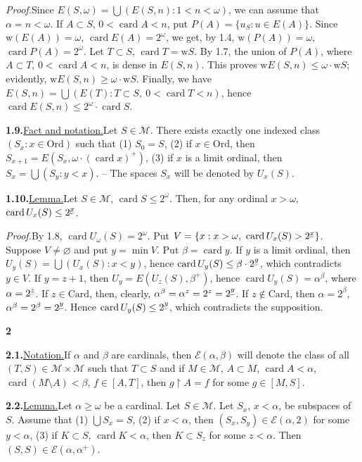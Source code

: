 \documentclass[12pt,a4paper]{article}
\newcommand{\M}{\mathcal{M}}
\newcommand{\E}{\mathcal{E}}
\newcommand{\card}{\operatorname{card}}
\newcommand{\Ord}{\mathrm{Ord}}
\newcommand{\Card}{\mathrm{Card}}
\newcommand{\wt}{\mathrm{w}}
\newcommand{\suprexp}[1]{\underaccent{\smile}{#1}}
\newcommand{\res}{\mathbin{\upharpoonright}}
\newcommand{\itemhead}[2]{\par\noindent\textbf{#1.}\enspace\underline{#2.}\enspace}
\newcommand{\prooftext}{\par\textit{Proof.}\enspace}
\newcommand{\sectionnumber}[1]{\par\medskip\begin{center}\textbf{#1}\end{center}}
\begin{document}
\prooftext Since $E(S,\omega)=\bigcup(E(S,n):1<n<\omega)$, we can assume that $\alpha=n<\omega$. If $A\subset S$, $0<\card A<n$, put $P(A)=\{u_S:u\in E(A)\}$. Since $\wt(E(A))=\omega$, $\card E(A)=2^\omega$, we get, by 1.4, $\wt(P(A))=\omega$, $\card P(A)=2^\omega$. Let $T\subset S$, $\card T=\wt S$. By 1.7, the union of $P(A)$, where $A\subset T$, $0<\card A<n$, is dense in $E(S,n)$. This proves $\wt E(S,n)\leq\omega\cdot\wt S$; evidently, $\wt E(S,n)\geq\omega\cdot\wt S$. Finally, we have $E(S,n)=\bigcup(E(T):T\subset S,\ 0<\card T<n)$, hence $\card E(S,n)\leq2^\omega\cdot\card S$.

\newpage %
\itemhead{1.9}{Fact and notation}Let $S\in\M$. There exists exactly one indexed class $(S_x:x\in\Ord)$ such that (1) $S_0=S$, (2) if $x\in\Ord$, then $S_{x+1}=E(S_x,\omega\cdot(\card x)^+)$, (3) if $x$ is a limit ordinal, then $S_x=\bigcup(S_y:y<x)$. -- The spaces $S_x$ will be denoted by $U_x(S)$.

\itemhead{1.10}{Lemma}Let $S\in\M$, $\card S\leq2^\omega$. Then, for any ordinal $x>\omega$, $\card U_x(S)\leq2^{\suprexp{x}}$.

\prooftext By 1.8, $\card U_\omega(S)=2^\omega$. Put $V=\{x:x>\omega,\ \card U_x(S)>2^{\suprexp{x}}\}$. Suppose $V\ne\varnothing$ and put $y=\min V$. Put $\beta=\card y$. If $y$ is a limit ordinal, then $U_y(S)=\bigcup(U_x(S):x<y)$, hence $\card U_y(S)\leq\beta\cdot2^{\suprexp{y}}$, which contradicts $y\in V$. If $y=z+1$, then $U_y=E(U_z(S),\beta^+)$, hence $\card U_y(S)=\alpha^\beta$, where $\alpha=2^{\suprexp{z}}$. If $z\in\Card$, then, clearly, $\alpha^\beta=\alpha^z=2^z=2^{\suprexp{y}}$. If $z\notin\Card$, then $\alpha=2^\beta$, $\alpha^\beta=2^\beta=2^{\suprexp{y}}$. Hence $\card U_y(S)\leq2^{\suprexp{y}}$, which contradicts the supposition.

\sectionnumber{2}
\itemhead{2.1}{Notation}If $\alpha$ and $\beta$ are cardinals, then $\E(\alpha,\beta)$ will denote the class of all $(T,S)\in\M\times\M$ such that $T\subset S$ and if $M\in\M$, $A\subset M$, $\card A<\alpha$, $\card(M\setminus A)<\beta$, $f\in[A,T]$, then $g\res A=f$ for some $g\in[M,S]$.

\itemhead{2.2}{Lemma}Let $\alpha\geq\omega$ be a cardinal. Let $S\in\M$. Let $S_x$, $x<\alpha$, be subspaces of $S$. Assume that (1) $\bigcup S_x=S$, (2) if $x<\alpha$, then $(S_x,S_y)\in\E(\alpha,2)$ for some $y<\alpha$, (3) if $K\subset S$, $\card K<\alpha$, then $K\subset S_z$ for some $z<\alpha$. Then $(S,S)\in\E(\alpha,\alpha^+)$.
\end{document}
